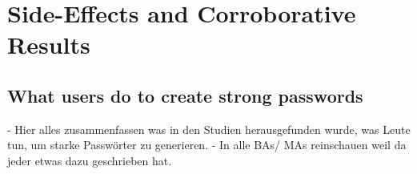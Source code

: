 \chapter[Side-Effects and Corroborative Results]{Side-Effects and Corroborative Results}\label{chap:side_effects}

\section{What users do to create strong passwords}
- Hier alles zusammenfassen was in den Studien herausgefunden wurde, 
was Leute tun, um starke Passwörter zu generieren. 
- In alle BAs/ MAs reinschauen weil da jeder etwas dazu geschrieben hat. 


